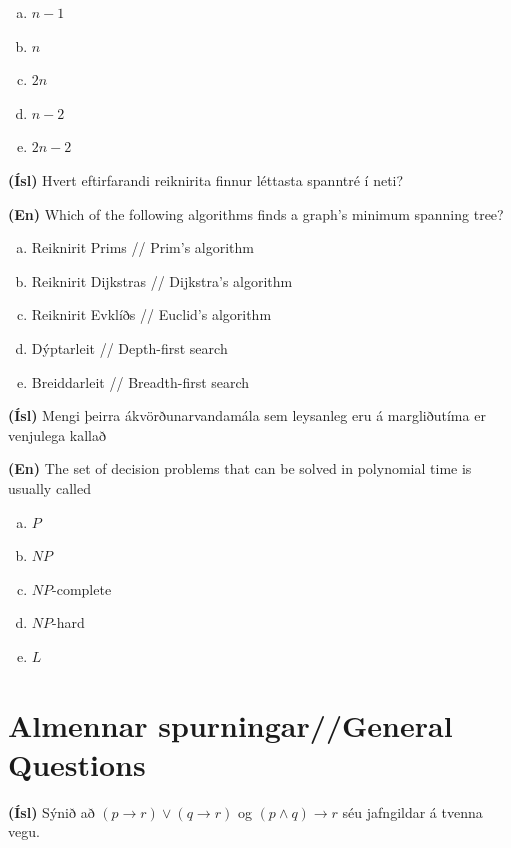 \documentclass[addpoints]{exam}
\begin{document}
\begin{questions}
\begin{enumerate}[a)]
    \item $n-1$
    \item $n$
    \item $2n$
    \item $n-2$
    \item $2n-2$ %
\end{enumerate}

\question[3]

\textbf{(Ísl)} Hvert eftirfarandi reiknirita finnur léttasta spanntré í neti?

\textbf{(En)} Which of the following algorithms finds a graph's minimum spanning tree?

\begin{enumerate}[a)]
    \item Reiknirit Prims // Prim's algorithm %
    \item Reiknirit Dijkstras // Dijkstra's algorithm
    \item Reiknirit Evklíðs // Euclid's algorithm
    \item Dýptarleit // Depth-first search
    \item Breiddarleit // Breadth-first search
\end{enumerate}

\question[3]

\textbf{(Ísl)} Mengi þeirra ákvörðunarvandamála sem leysanleg eru á margliðutíma er venjulega kallað

\textbf{(En)} The set of decision problems that can be solved in polynomial time is usually called

\begin{enumerate}[a)]
    \item $P$ %
    \item $NP$
    \item $NP$-complete
    \item $NP$-hard
    \item $L$
\end{enumerate}

\newpage

\section{Almennar spurningar//General Questions}

\question[10] 

\textbf{(Ísl)} Sýnið að $(p \to r) \lor (q \to r)$ og $(p \land q) \to r$ séu jafngildar á tvenna vegu.


\end{questions}
\end{document}
